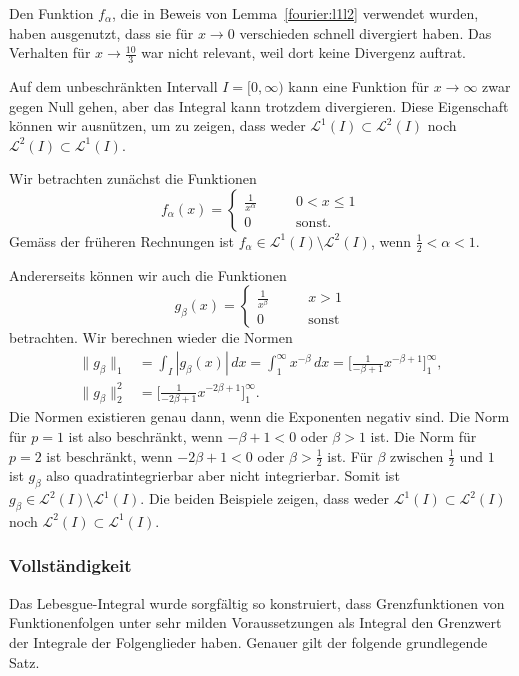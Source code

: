 \begin{beispiel}
Den Funktion $f_\alpha$, die in Beweis von Lemma~\ref{fourier:l1l2}
verwendet wurden, haben ausgenutzt, dass sie für $x\to 0$ verschieden 
schnell divergiert haben.
Das Verhalten für $x\to \frac{10}3$ war nicht relevant, weil dort keine
Divergenz auftrat.

Auf dem unbeschränkten Intervall $I=[0,\infty)$ kann eine Funktion 
für $x\to\infty$ zwar gegen Null gehen, aber das Integral kann trotzdem
divergieren.
Diese Eigenschaft können wir ausnützen, um zu zeigen, dass weder
$\mathcal{L}^1(I)\subset\mathcal{L}^2(I)$
noch
$\mathcal{L}^2(I)\subset\mathcal{L}^1(I)$.

Wir betrachten zunächst die Funktionen
\[
f_\alpha(x) = \begin{cases}
\displaystyle\frac1{x^\alpha}&\qquad0<x\le 1\\
0&\qquad\text{sonst.}
\end{cases}
\]
Gemäss der früheren Rechnungen ist
$f_\alpha\in\mathcal{L}^1(I)\setminus\mathcal{L}^2(I)$,
wenn $\frac12<\alpha<1$.

Andererseits können wir auch die Funktionen
\[
g_\beta(x)
=
\begin{cases}
\displaystyle\frac1{x^\beta}&\qquad x>1\\
0&\qquad\text{sonst}
\end{cases}
\]
betrachten.
Wir berechnen wieder die Normen
\begin{align*}
\| g_\beta\|_1
&=
\int_I|g_\beta(x)|\,dx
=
\int_1^\infty x^{-\beta}\,dx
=
\biggl[
\frac1{-\beta+1}x^{-\beta+1}
\biggr]_1^\infty,
\\
\|g_\beta\|_2^2
&=
\biggl[
\frac1{-2\beta+1}x^{-2\beta+1}
\biggr]_1^\infty.
\end{align*}
Die Normen existieren genau dann, wenn die Exponenten negativ sind.
Die Norm für $p=1$ ist also beschränkt, wenn $-\beta+1<0$ oder $\beta > 1$
ist.
Die Norm für $p=2$ ist beschränkt, wenn $-2\beta+1<0$ oder $\beta > \frac12$
ist.
Für $\beta$ zwischen $\frac12$ und $1$ ist $g_\beta$ also quadratintegrierbar
aber nicht integrierbar.
Somit ist $g_\beta\in\mathcal{L}^2(I)\setminus\mathcal{L}^1(I)$.
Die beiden Beispiele zeigen, dass weder
$\mathcal{L}^1(I)\subset\mathcal{L}^2(I)$
noch
$\mathcal{L}^2(I)\subset\mathcal{L}^1(I)$.
\end{beispiel}

\subsubsection{Vollständigkeit}
Das Lebesgue-Integral wurde sorgfältig so konstruiert, dass Grenzfunktionen
von Funktionenfolgen unter sehr milden Voraussetzungen als Integral den
Grenzwert der Integrale der Folgenglieder haben.
Genauer gilt der folgende grundlegende Satz.

